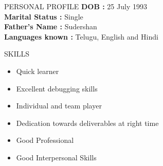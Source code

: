 \documentclass{resume} %
\begin{document}
\begin{rSection}{PERSONAL PROFILE}
  \textbf {DOB :} 25 July 1993\\
  \textbf {Marital Status :} Single \\
  \textbf {Father's Name : } Sudershan \\
  \textbf {Languages known :} Telugu, English and Hindi \\

\end{rSection}

\begin{rSection}{SKILLS}
  \begin{itemize}
  \item Quick learner
  \item Excellent debugging skills
  \item Individual and team player
  \item Dedication towards deliverables at right time
  \item Good Professional
  \item Good Interpersonal Skills

  \end{itemize}

\end{rSection}
\end{document}
